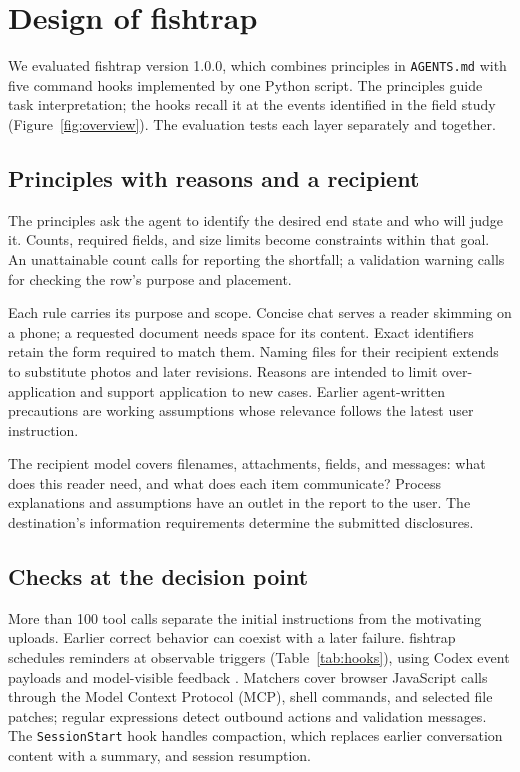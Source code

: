 \section{Design of fishtrap}
\label{sec:design}

We evaluated fishtrap version 1.0.0, which combines principles in \texttt{AGENTS.md} with five command hooks implemented by one Python script. The principles guide task interpretation; the hooks recall it at the events identified in the field study (Figure~\ref{fig:overview}). The evaluation tests each layer separately and together.

\subsection{Principles with reasons and a recipient}

The principles ask the agent to identify the desired end state and who will judge it. Counts, required fields, and size limits become constraints within that goal. An unattainable count calls for reporting the shortfall; a validation warning calls for checking the row's purpose and placement.

Each rule carries its purpose and scope. Concise chat serves a reader skimming on a phone; a requested document needs space for its content. Exact identifiers retain the form required to match them. Naming files for their recipient extends to substitute photos and later revisions. Reasons are intended to limit over-application and support application to new cases. Earlier agent-written precautions are working assumptions whose relevance follows the latest user instruction.

The recipient model covers filenames, attachments, fields, and messages: what does this reader need, and what does each item communicate? Process explanations and assumptions have an outlet in the report to the user. The destination's information requirements determine the submitted disclosures.

\subsection{Checks at the decision point}

More than 100 tool calls separate the initial instructions from the motivating uploads. Earlier correct behavior can coexist with a later failure. fishtrap schedules reminders at observable triggers (Table~\ref{tab:hooks}), using Codex event payloads and model-visible feedback \citep{openai2026hooks}. Matchers cover browser JavaScript calls through the Model Context Protocol (MCP), shell commands, and selected file patches; regular expressions detect outbound actions and validation messages. The \texttt{SessionStart} hook handles compaction, which replaces earlier conversation content with a summary, and session resumption.

